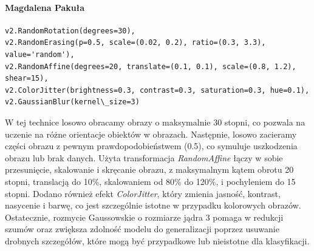 \documentclass[10pt]{article}
\begin{document}
\begin{multicols}{2}
    \paragraph{Magdalena Pakuła}
    \scriptsize
    \begin{verbatim}
v2.RandomRotation(degrees=30),
v2.RandomErasing(p=0.5, scale=(0.02, 0.2), ratio=(0.3, 3.3), value='random'),
v2.RandomAffine(degrees=20, translate=(0.1, 0.1), scale=(0.8, 1.2), shear=15),
v2.ColorJitter(brightness=0.3, contrast=0.3, saturation=0.3, hue=0.1),
v2.GaussianBlur(kernel\_size=3)
\end{verbatim}
    \normalsize
    W tej technice losowo obracamy obrazy o maksymalnie 30 stopni, co pozwala na uczenie na różne orientacje obiektów w obrazach.
    Następnie, losowo zacieramy części obrazu z pewnym prawdopodobieństwem (0.5), co symuluje uszkodzenia obrazu lub brak danych.
    Użyta transformacja \emph{RandomAffine} łączy w sobie przesunięcie, skalowanie i skręcanie obrazu, z maksymalnym kątem obrotu 20 stopni, translacją do 10\%, skalowaniem od 80\% do 120\%, i pochyleniem do 15 stopni.
    Dodano również efekt \emph{ColorJitter}, który zmienia jasność, kontrast, nasycenie i barwę, co jest szczególnie istotne w przypadku kolorowych obrazów.
    Ostatecznie, rozmycie Gaussowskie o rozmiarze jądra 3 pomaga w redukcji szumów oraz zwiększa zdolność modelu do generalizacji poprzez usuwanie drobnych szczegółów, które mogą być przypadkowe lub nieistotne dla klasyfikacji.
\end{multicols}
\end{document}
